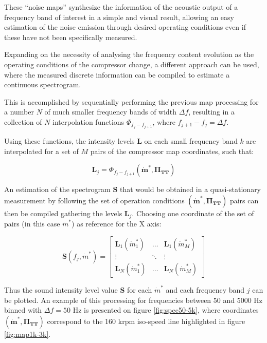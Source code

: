 These ``noise maps'' synthesize the information of the acoustic output of a frequency band of interest in a simple and visual result, allowing an easy estimation of the noise emission through desired operating conditions even if these have not been specifically measured.

Expanding on the necessity of analysing the frequency content evolution as the operating conditions of the compressor change, a different approach can be used, where the measured discrete information can be compiled to estimate a continuous spectrogram.

This is accomplished by sequentially performing the previous map processing for a number $N$ of much smaller frequency bands of width $\Delta f$, resulting in a collection of $N$ interpolation functions $\Phi_{f_j-f_{j+1}}$, where $f_{j+1}-f_j = \Delta f$.

Using these functions, the intensity levels $\mathbf L$ on each small frequency band $k$ are interpolated for a set of $M$ pairs of the compressor map coordinates, such that:

\begin{equation}
 \mathbf L_j=\Phi_{f_j-f_{j+1}}(\bm{\dot m^*},\bm{\Pi_\text{TT}})
\end{equation}

An estimation of the spectrogram $\mathbf S$ that would be obtained in a quasi-stationary measurement by following the set of operation conditions $(\bm{\dot m^*},\bm{\Pi_\text{TT}})$ pairs can then be compiled gathering the levels $\mathbf L_j$. Choosing one coordinate of the set of pairs (in this case $\dot m^*$) as reference for the X axis:

\begin{equation}
  \mathbf S(f_j,\dot m^*)=\begin{bmatrix}
    \mathbf L_1(\dot m^*_1) & \hdots & \mathbf L_1(\dot m^*_M)\\
    \vdots & \ddots & \vdots \\
    \mathbf L_N(\dot m^*_1) & \hdots & \mathbf L_N(\dot m^*_M)
  \end{bmatrix}
\end{equation}

Thus the sound intensity level value $\mathbf S$ for each $\dot m^*$ and each frequency band $j$ can be plotted. An example of this processing for frequencies between 50 and 5000 Hz binned with $\Delta f = 50$ Hz is presented on figure \ref{fig:spec50-5k}, where coordinates $(\bm{\dot{m}^*},\bm{\Pi_\text{TT}})$ correspond to the 160 krpm iso-speed line highlighted in figure \ref{fig:map1k-3k}.


